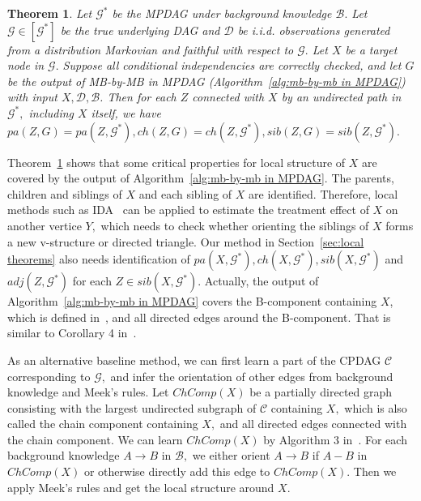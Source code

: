 \documentclass{article}
\newtheorem{theorem}{Theorem}
\begin{document}
\begin{theorem}
\label{thm:mb-by-mb}
Let $\mathcal{G}^*$ be the MPDAG under background knowledge $\mathcal{B}.$ Let $\mathcal{G}\in [\mathcal{G}^*]$ be the true underlying DAG and $\mathcal{D}$ be i.i.d. observations generated from a distribution Markovian and faithful with respect to $\mathcal{G}.$ Let $X$ be a target node in $\mathcal{G}.$ Suppose all conditional independencies are correctly checked, and let $G$ be the output of MB-by-MB in MPDAG (Algorithm~\ref{alg:mb-by-mb in MPDAG}) with input $X,\mathcal{D},\mathcal{B}$.
Then for each $Z$ connected with $X$ by an undirected path in $\mathcal{G}^*,$ including $X$ itself, we have $pa(Z,G)=pa(Z,\mathcal{G}^*),ch(Z,G)=ch(Z,\mathcal{G}^*),sib(Z,G)=sib(Z,\mathcal{G}^*).$
\end{theorem}

Theorem~\ref{thm:mb-by-mb} shows that some critical properties for local structure of $X$ are covered by the output of Algorithm~\ref{alg:mb-by-mb in MPDAG}.
The parents, children and siblings of $X$ and each sibling of $X$ are identified.
Therefore, local methods such as IDA~\citep{fang2020ida} can be applied to estimate the treatment effect of $X$ on another vertice $Y,$ which needs to check whether orienting the siblings of $X$ forms a new v-structure or directed triangle.
Our method in Section~\ref{sec:local theorems} also needs identification of $pa(X,\mathcal{G}^*),ch(X,\mathcal{G}^*),sib(X,\mathcal{G}^*)$ and $adj(Z,\mathcal{G}^*)$ for each $Z\in sib(X,\mathcal{G}^*).$
Actually, the output of Algorithm~\ref{alg:mb-by-mb in MPDAG} covers the B-component containing $X$, which is defined in~\citep{fang2022representation}, and all directed edges around the B-component.
That is similar to Corollary 4 in~\citep{liu2020local}.

As an alternative baseline method, we can first learn a part of the CPDAG $\mathcal{C}$ corresponding to $\mathcal{G},$ and infer the orientation of other edges from background knowledge and Meek's rules.
Let $ChComp(X)$ be a partially directed graph consisting with the largest undirected subgraph of $\mathcal{C}$ containing $X,$ which is also called the chain component containing $X,$ and all directed edges connected with the chain component.
We can learn $ChComp(X)$ by Algorithm 3 in~\citep{liu2020local}.
For each background knowledge $A\to B$ in $\mathcal{B},$ we either orient $A\to B$ if $A-B$ in $ChComp(X)$ or otherwise directly add this edge to $ChComp(X).$
Then we apply Meek's rules and get the local structure around $X.$
\end{document}
